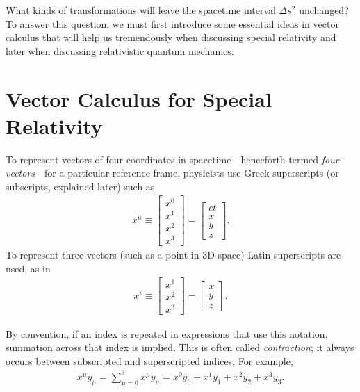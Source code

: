 \documentclass[titlepage,letterpaper,onecolumn,11pt,final]{report}
\numberwithin{equation}{section}
\numberwithin{figure}{section}
\begin{document}
What kinds of transformations will leave the spacetime interval $\Delta s^{2}$ unchanged? To answer this question, we must first introduce some essential ideas in vector calculus that will help us tremendously when discussing special relativity and later when discussing relativistic quantum mechanics.

\section{Vector Calculus for Special Relativity}

To represent vectors of four coordinates in spacetime---henceforth termed \emph{four-vectors}---for a particular reference frame, physicists use Greek superscripts (or subscripts, explained later) such as
\begin{gather}
	\label{eq:contravariant_4v}
	x^{\mu} \equiv
	\begin{bmatrix}
		x^{0} \\[6pt]
		x^{1} \\[6pt]
		x^{2} \\[6pt]
		x^{3} 
	\end{bmatrix}
	=
	\begin{bmatrix}
		c t \\[6pt]
		x \\[6pt]
		y \\[6pt]
		z
	\end{bmatrix}
	.
\end{gather}
%
To represent three-vectors (such as a point in 3D space) Latin superscripts are used, as in
\begin{gather}
	x^{i} \equiv
	\begin{bmatrix}
		x^{1} \\[6pt]
		x^{2} \\[6pt]
		x^{3}
	\end{bmatrix}
	=
	\begin{bmatrix}
		x \\[6pt]
		y \\[6pt]
		z
	\end{bmatrix}
	.
\end{gather}

By convention, if an index is repeated in expressions that use this notation, summation across that index is implied. This is often called \emph{contraction}; it always occurs between subscripted and superscripted indices. For example, 
\begin{gather}
	x^{\mu}y_{\mu} = \sum_{\mu = 0}^{3}{x^{\mu}y_{\mu}} = x^{0}y_{0} + x^{1}y_{1} + x^{2}y_{2} + x^{3}y_{3}.
\end{gather}
\end{document}
